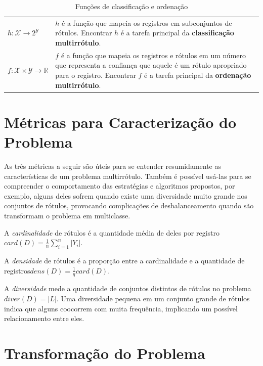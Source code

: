 \documentclass[runningheads,a4paper]{llncs}
\begin{document}
\begin{table}
	\centering
	\begin{tabular}{| >{\centering}p{4cm} | m{8cm} |}
		\hline
		\multicolumn{2}{|c|}{\textit{Funções}} \\
		\hline
		$h : \mathcal{X} \to 2^\mathcal{Y}$ & $h$ é a função que mapeia os registros em subconjuntos de rótulos. Encontrar $h$ é a tarefa principal da \textbf{classificação multirrótulo}. \\
		\hline
		$f : \mathcal{X} \times \mathcal{Y} \to \mathbb{R}$ & $f$ é a função que mapeia os registros e rótulos em um número que representa a confiança que aquele é um rótulo apropriado para o registro. Encontrar $f$ é a tarefa principal da \textbf{ordenação multirrótulo}. \\
		\hline
	\end{tabular}
	\caption{Funções de classificação e ordenação}
	\label{tab:matematica-funcoes}
\end{table}	

\section{Métricas para Caracterização do Problema} \label{sec:metricas}

As três métricas a seguir \cite{Zhang2014-be} são úteis para se entender resumidamente as características de um problema multirrótulo. Também é possível usá-las para se compreender o comportamento das estratégias e algoritmos propostos, por exemplo, alguns deles sofrem quando existe uma diversidade muito grande nos conjuntos de rótulos, provocando complicações de desbalanceamento quando são transformam o problema em multiclasse. 

A \textit{cardinalidade} de rótulos é a quantidade média de deles por registro $card(D) = \frac{1}{n} \sum_{i = 1}^{n} |Y_i|$.

A \textit{densidade} de rótulos é a proporção entre a cardinalidade e a quantidade de registros$dens(D) = \frac{1}{q} card(D)$.

A \textit{diversidade} mede a quantidade de conjuntos distintos de rótulos no problema $diver(D) = |L|$. Uma diversidade pequena em um conjunto grande de rótulos indica que alguns coocorrem com muita frequência, implicando um possível relacionamento entre eles.

\section{Transformação do Problema}\label{sec:transprob}
\end{document}
